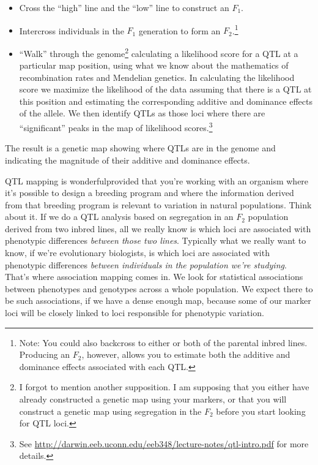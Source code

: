 \documentclass[12pt]{article}
\begin{document}
\begin{itemize}

\item Cross the ``high'' line and the ``low'' line to construct an
  $F_1$. 

\item Intercross individuals in the $F_1$ generation to form an
  $F_2$.\footnote{Note: You could also backcross to either or both of
    the parental inbred lines. Producing an $F_2$, however, allows you
    to estimate both the additive and dominance effects associated
    with each QTL.}

\item ``Walk'' through the genome\footnote{I forgot to mention another
    supposition. I am supposing that you either have already
    constructed a genetic map using your markers, or that you will
    construct a genetic map using segregation in the $F_2$ before you
    start looking for QTL loci.} calculating a likelihood score for a
  QTL at a particular map position, using what we know about the
  mathematics of recombination rates and Mendelian genetics. In
  calculating the likelihood score we maximize the likelihood of the
  data assuming that there is a QTL at this position and estimating
  the corresponding additive and dominance effects of the allele. We
  then identify QTLs as those loci where there are ``significant''
  peaks in the map of likelihood scores.\footnote{See
    \url{http://darwin.eeb.uconn.edu/eeb348/lecture-notes/qtl-intro.pdf}
    for more details.}

\end{itemize}
The result is a genetic map showing where QTLs are in the genome and
indicating the magnitude of their additive and dominance effects.

QTL mapping is wonderful{\dash}provided that you're working with an
organism where it's possible to design a breeding program and where
the information derived from that breeding program is relevant to
variation in natural populations. Think about it. If we do a QTL
analysis based on segregation in an $F_2$ population derived from two
inbred lines, all we really know is which loci are associated with
phenotypic differences {\it between those two lines}. Typically what
we really want to know, if we're evolutionary biologists, is which
loci are associated with phenotypic differences {\it between
  individuals in the population we're studying}. That's where
association mapping comes in. We look for statistical associations
between phenotypes and genotypes across a whole population. We expect
there to be such associations, if we have a dense enough map, because
some of our marker loci will be closely linked to loci responsible for
phenotypic variation.
\end{document}
